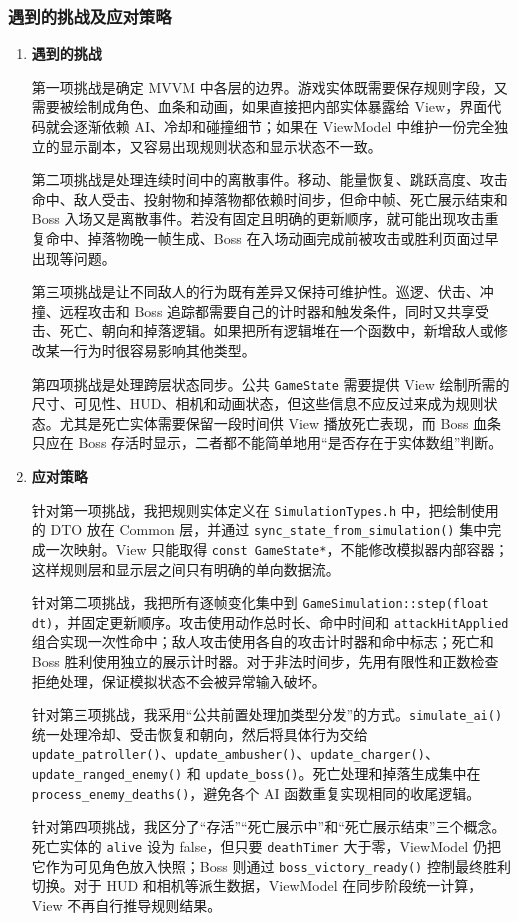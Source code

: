 \documentclass[a4paper]{article}
\begin{document}
\subsubsection{遇到的挑战及应对策略}

\begin{enumerate}
  \item \textbf{遇到的挑战}

    第一项挑战是确定 MVVM 中各层的边界。游戏实体既需要保存规则字段，又需要被绘制成角色、血条和动画，如果直接把内部实体暴露给 View，界面代码就会逐渐依赖 AI、冷却和碰撞细节；如果在 ViewModel 中维护一份完全独立的显示副本，又容易出现规则状态和显示状态不一致。

    第二项挑战是处理连续时间中的离散事件。移动、能量恢复、跳跃高度、攻击命中、敌人受击、投射物和掉落物都依赖时间步，但命中帧、死亡展示结束和 Boss 入场又是离散事件。若没有固定且明确的更新顺序，就可能出现攻击重复命中、掉落物晚一帧生成、Boss 在入场动画完成前被攻击或胜利页面过早出现等问题。

    第三项挑战是让不同敌人的行为既有差异又保持可维护性。巡逻、伏击、冲撞、远程攻击和 Boss 追踪都需要自己的计时器和触发条件，同时又共享受击、死亡、朝向和掉落逻辑。如果把所有逻辑堆在一个函数中，新增敌人或修改某一行为时很容易影响其他类型。

    第四项挑战是处理跨层状态同步。公共 \texttt{GameState} 需要提供 View 绘制所需的尺寸、可见性、HUD、相机和动画状态，但这些信息不应反过来成为规则状态。尤其是死亡实体需要保留一段时间供 View 播放死亡表现，而 Boss 血条只应在 Boss 存活时显示，二者都不能简单地用“是否存在于实体数组”判断。

  \item \textbf{应对策略}

    针对第一项挑战，我把规则实体定义在 \texttt{SimulationTypes.h} 中，把绘制使用的 DTO 放在 Common 层，并通过 \texttt{sync\_state\_from\_simulation()} 集中完成一次映射。View 只能取得 \texttt{const GameState*}，不能修改模拟器内部容器；这样规则层和显示层之间只有明确的单向数据流。

    针对第二项挑战，我把所有逐帧变化集中到 \texttt{GameSimulation::step(float dt)}，并固定更新顺序。攻击使用动作总时长、命中时间和 \texttt{attackHitApplied} 组合实现一次性命中；敌人攻击使用各自的攻击计时器和命中标志；死亡和 Boss 胜利使用独立的展示计时器。对于非法时间步，先用有限性和正数检查拒绝处理，保证模拟状态不会被异常输入破坏。

    针对第三项挑战，我采用“公共前置处理加类型分发”的方式。\texttt{simulate\_ai()} 统一处理冷却、受击恢复和朝向，然后将具体行为交给 \texttt{update\_patroller()}、\texttt{update\_ambusher()}、\texttt{update\_charger()}、\texttt{update\_ranged\_enemy()} 和 \texttt{update\_boss()}。死亡处理和掉落生成集中在 \texttt{process\_enemy\_deaths()}，避免各个 AI 函数重复实现相同的收尾逻辑。

    针对第四项挑战，我区分了“存活”“死亡展示中”和“死亡展示结束”三个概念。死亡实体的 \texttt{alive} 设为 false，但只要 \texttt{deathTimer} 大于零，ViewModel 仍把它作为可见角色放入快照；Boss 则通过 \texttt{boss\_victory\_ready()} 控制最终胜利切换。对于 HUD 和相机等派生数据，ViewModel 在同步阶段统一计算，View 不再自行推导规则结果。
\end{enumerate}
\end{document}
